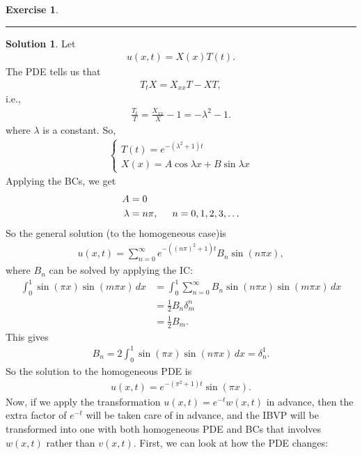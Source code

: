 \documentclass{article}
\theoremstyle{definition}
\newtheorem*{exer*}{Exercise}
\newtheorem*{sln*}{Solution}
\newcommand{\f}[2]{\frac{#1}{#2}}
\begin{document}
\begin{exer*}
	\noindent\rule{\textwidth}{0.5pt}
	\begin{sln*}
		Let
		\begin{align*}
		u(x,t) = X(x)T(t).
		\end{align*}
		The PDE tells us that
		\begin{align*}
		T_t X = X_{xx} T - XT,
		\end{align*}
		i.e.,
		\begin{align*}
		\f{T_t}{T} = \f{X_{xx}}{X} - 1 = -\lambda^2 - 1.
		\end{align*}
		where $\lambda$ is a constant. So,
		\begin{align*}
		\begin{cases}
		T(t) = e^{-(\lambda^2 + 1)t}\\
		X(x) = A\cos\lambda x + B\sin\lambda x
		\end{cases}
		\end{align*}
		Applying the BCs, we get
		\begin{align*}
		A &= 0\\
		\lambda &= n\pi, \hspace{0.5cm} n = 0,1,2,3,\dots
		\end{align*}
		So the general solution (to the homogeneous case)is
		\begin{align*}
		u(x,t) = \sum_{n=0}^\infty e^{-((n\pi)^2 + 1)  t}B_n \sin(n\pi x),
		\end{align*}
		where $B_n$ can be solved by applying the IC:
		\begin{align*}
		\int^1_0 \sin(\pi x)\sin(m\pi x)\,dx &= \int^1_0 \sum_{n=0}^\infty B_n \sin(n\pi x)\sin(m\pi x)\,dx\\
		&= \frac{1}{2}B_n \delta^n_m\\
		&= \frac{1}{2}B_m.
		\end{align*}
		This gives
		\begin{align*}
		B_n = 2\int^1_0 \sin(\pi x)\sin(n\pi x)\,dx = \delta^1_n.
		\end{align*}
		So the solution to the homogeneous PDE is
		\begin{align*}
		\boxed{u(x,t) = e^{-(\pi^2 + 1) t}\sin(\pi x)}.
		\end{align*}
		Now, if we apply the transformation $u(x,t) = e^{-t}w(x,t)$ in advance, then the extra factor of $e^{-t}$ will be taken care of in advance, and the IBVP will be transformed into one with both homogeneous PDE and BCs that involves $w(x,t)$ rather than $v(x,t)$. First, we can look at how the PDE changes:
		\begin{align*}

\end{align*}
\end{sln*}
\end{exer*}
\end{document}
